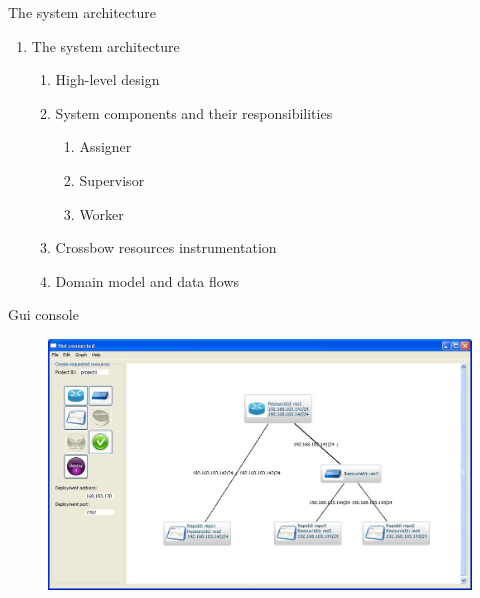 \documentclass{beamer}
\begin{document}
\setcounter{enumi_chapter}{\value{enumi}}


\begin{frame}{The system architecture}

	\begin{enumerate}
		\setcounter{enumi}{\value{enumi_chapter}}

		\item The system architecture

		\begin{enumerate}
			\item High-level design \pause
			\item System components and their responsibilities

				\begin{enumerate}
					\item Assigner
					\item Supervisor
					\item Worker
				\end{enumerate}

				\pause
			
			\item Crossbow resources instrumentation \pause
			\item Domain model and data flows
		\end{enumerate}

	\end{enumerate}

\end{frame}

\setcounter{enumi_chapter}{\value{enumi}}

\begin{frame}{Gui console}
		
	\begin{figure}[H]
		\includegraphics[width=\textwidth]{img/network.jpg}
	\end{figure}

\end{frame}
\end{document}
